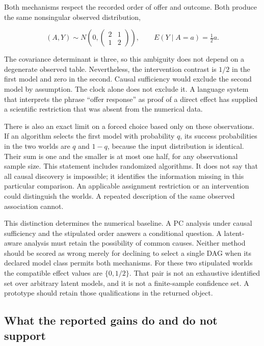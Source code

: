 Both mechanisms respect the recorded order of offer and outcome. Both
produce the same nonsingular observed distribution,

\[
 (A,Y)\sim N\!\left(0,
 \begin{pmatrix}2&1\\1&2\end{pmatrix}\right),
 \qquad E(Y\mid A=a)=\tfrac12a.
\]

The covariance determinant is three, so this ambiguity does not depend
on a degenerate observed table. Nevertheless, the intervention contrast
is \(1/2\) in the first model and zero in the second. Causal sufficiency
would exclude the second model by assumption. The clock alone does not
exclude it. A language system that interprets the phrase ``offer
response'' as proof of a direct effect has supplied a scientific
restriction that was absent from the numerical data.

There is also an exact limit on a forced choice based only on these
observations. If an algorithm selects the first model with probability
\(q\), its success probabilities in the two worlds are \(q\) and
\(1-q\), because the input distribution is identical. Their sum is one
and the smaller is at most one half, for any observational sample size.
This statement includes randomized algorithms. It does not say that all
causal discovery is impossible; it identifies the information missing in
this particular comparison. An applicable assignment restriction or an
intervention could distinguish the worlds. A repeated description of the
same observed association cannot.

This distinction determines the numerical baseline. A PC analysis under
causal sufficiency and the stipulated order answers a conditional
question. A latent-aware analysis must retain the possibility of common
causes. Neither method should be scored as wrong merely for declining to
select a single DAG when its declared model class permits both
mechanisms. For these two stipulated worlds the compatible effect values
are \(\{0,1/2\}\). That pair is not an exhaustive identified set over
arbitrary latent models, and it is not a finite-sample confidence set. A
prototype should retain those qualifications in the returned object.
\citep{exec14_iid_oracle}

\hypertarget{what-the-reported-gains-do-and-do-not-support}{%
\subsection{What the reported gains do and do not
support}\label{what-the-reported-gains-do-and-do-not-support}}


